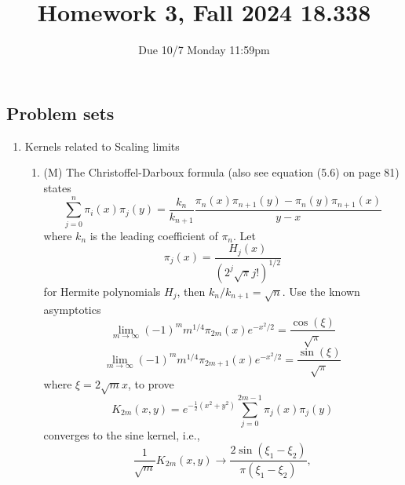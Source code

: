 \documentclass{article}
\title{Homework 3, Fall 2024 18.338}
\author{Due 10/7 Monday 11:59pm}
\date{}
\begin{document}
\maketitle




\subsection*{Problem sets}
\begin{enumerate}
    \item Kernels related to Scaling limits
    \begin{enumerate}
        \item (M) The Christoffel-Darboux formula (also see equation (5.6) on page 81) states
        \begin{equation*}
            \sum_{j=0}^n\pi_i(x)\pi_j(y) = \frac{k_n}{k_{n+1}}\frac{\pi_n(x)\pi_{n+1}(y)-\pi_n(y)\pi_{n+1}(x)}{y-x}
        \end{equation*}
        where $k_n$ is the leading coefficient of $\pi_n$. Let 
        \begin{equation*}
            \pi_j(x) = \frac{H_j(x)}{(2^j\sqrt\pi j!)^{1/2}}
        \end{equation*}
        for Hermite polynomials $H_j$, then $k_n/k_{n+1} = \sqrt{n}$. Use the known asymptotics
        \begin{equation*}
            \lim_{m\to\infty}(-1)^m m^{1/4}\pi_{2m}(x)e^{-x^2/2} = \frac{\cos(\xi)}{\sqrt{\pi}}
        \end{equation*}
        \begin{equation*}
            \lim_{m\to\infty}(-1)^m m^{1/4}\pi_{2m+1}(x)e^{-x^2/2} = \frac{\sin(\xi)}{\sqrt{\pi}}
        \end{equation*}
        where $\xi = 2\sqrt{m}x$, to prove 
        \begin{equation*}
            K_{2m}(x, y) = e^{-\frac{1}{2}(x^2+y^2)}\sum_{j=0}^{2m-1}\pi_j(x)\pi_j(y)
        \end{equation*}
        converges to the sine kernel, i.e., 
        \begin{equation*}
            \frac{1}{\sqrt{m}}K_{2m}(x, y) \to \frac{2\sin(\xi_1-\xi_2)}{\pi(\xi_1-\xi_2)},

\end{equation*}
\end{enumerate}
\end{enumerate}
\end{document}
